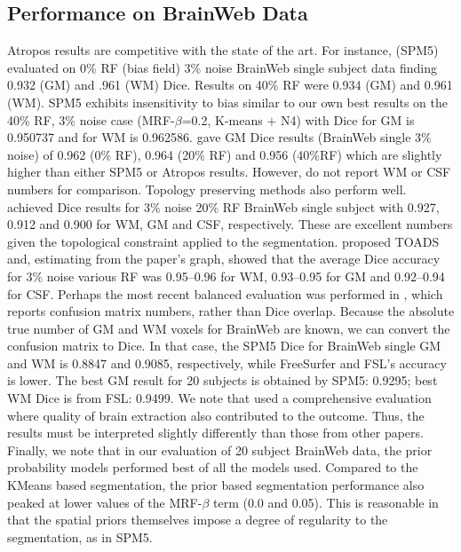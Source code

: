 \documentclass[11pt,english]{article}
\begin{document}
\subsection{Performance on BrainWeb Data}
Atropos results are competitive with the state of the art.  For
instance, \cite{Ashburner2005} (SPM5) evaluated on 0\% RF (bias field) 3\%
noise BrainWeb single subject data finding 0.932 (GM) and .961 (WM)
Dice. Results on 40\% RF were 0.934 (GM) and 0.961 (WM). SPM5 exhibits
insensitivity to bias similar to our own best results on the 40\% RF, 3\% 
noise case (MRF-$\beta$=0.2, K-means $+$ N4) with Dice for GM is
0.950737 and for WM is 0.962586.  \cite{Nakamura2009} gave GM Dice
results (BrainWeb single 3\% noise) of 0.962 (0\% RF), 0.964 (20\% RF)
and 0.956 (40\%RF) which are slightly higher than either SPM5 or Atropos
results.  However, \cite{Nakamura2009} do not report WM or CSF numbers
for comparison.  Topology preserving methods also perform well.
\cite{Shiee2010} achieved Dice results for 3\% noise 20\% RF BrainWeb
single subject with 0.927, 0.912 and 0.900 for WM, GM and CSF,
respectively.  These are excellent numbers given the topological constraint applied to the segmentation.  
\cite{Bazin2007c} proposed TOADS and, estimating from the paper's
graph, showed that the average Dice accuracy for 3\% noise various RF
was 0.95--0.96 for WM, 0.93--0.95 for GM and 0.92--0.94 for CSF.
Perhaps the most recent balanced evaluation was performed in
\citep{Klauschen2009}, which reports confusion matrix numbers, rather
than Dice overlap.  Because the absolute true number of GM and WM
voxels for BrainWeb are known, we can convert the confusion matrix to
Dice.  In that case, the SPM5 Dice for BrainWeb single GM and WM is
0.8847 and 0.9085, respectively, while FreeSurfer and FSL's accuracy
is lower. The best GM result for 20 subjects is obtained by SPM5:
0.9295; best WM Dice is from FSL: 0.9499.  We note that
\cite{Klauschen2009} used a comprehensive evaluation where quality of
brain extraction also contributed to the outcome.  Thus, the results
must be interpreted slightly differently than those from other papers.
Finally, we note that in our evaluation of 20 subject BrainWeb data, the prior
probability models performed best of all the models used.  Compared to
the KMeans based segmentation, the prior based segmentation
performance also peaked at lower values of the MRF-$\beta$ term (0.0
and 0.05).  This is reasonable in that the spatial priors themselves
impose a degree of regularity to the segmentation, as in SPM5.
\end{document}
